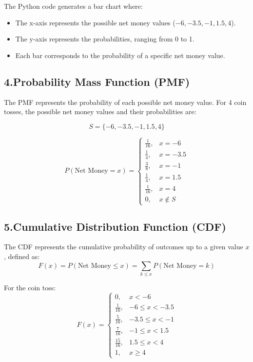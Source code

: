 \documentclass[journal]{IEEEtran}
\numberwithin{equation}{enumi}
\numberwithin{figure}{enumi}
\begin{document}
The Python code generates a bar chart where:
\begin{itemize}
    \item The x-axis represents the possible net money values (\( -6, -3.5, -1, 1.5, 4 \)).
    \item The y-axis represents the probabilities, ranging from 0 to 1.
    \item Each bar corresponds to the probability of a specific net money value.
\end{itemize}

\subsection*{4.Probability Mass Function (PMF)}

The PMF represents the probability of each possible net money value. For 4 coin tosses, the possible net money values and their probabilities are:

\[
S = \{-6, -3.5, -1, 1.5, 4\}
\]

\[
P(\text{Net Money} = x) =
\begin{cases}
\frac{1}{16}, & x = -6 \\
\frac{1}{4}, & x = -3.5 \\
\frac{3}{8}, & x = -1 \\
\frac{1}{4}, & x = 1.5 \\
\frac{1}{16}, & x = 4 \\
0, & x \notin S
\end{cases}
\]

\subsection*{5.Cumulative Distribution Function (CDF)}

The CDF represents the cumulative probability of outcomes up to a given value \(x\), defined as:
\[
F(x) = P(\text{Net Money} \leq x) = \sum_{k \leq x} P(\text{Net Money} = k)
\]

For the coin toss:
\[
F(x) =
\begin{cases}
0, & x < -6 \\
\frac{1}{16}, & -6 \leq x < -3.5 \\
\frac{5}{16}, & -3.5 \leq x < -1 \\
\frac{7}{16}, & -1 \leq x < 1.5 \\
\frac{15}{16}, & 1.5 \leq x < 4 \\
1, & x \geq 4
\end{cases}
\]
\end{document}
